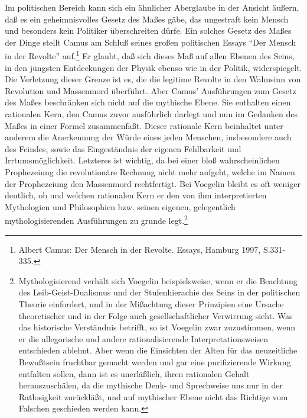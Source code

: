 Im politischen Bereich kann sich ein ähnlicher Aberglaube in der Ansicht
äußern, daß es ein geheimnisvolles Gesetz des Maßes gäbe, das ungestraft kein
Mensch und besonders kein Politiker überschreiten dürfe. Ein solches Gesetz
des Maßes der Dinge stellt Camus am Schluß seines großen politischen Essays
"`Der Mensch in der Revolte"' auf.\footnote{Albert Camus: Der Mensch in der
  Revolte. Essays, Hamburg 1997, S.331-335.} Er glaubt, daß sich dieses Maß
auf allen Ebenen des Seins, in den jüngsten Entdeckungen der Physik ebenso wie
in der Politik, widerspiegelt. Die Verletzung dieser Grenze ist es, die die
legitime Revolte in den Wahnsinn von Revolution und Massenmord überführt. Aber
Camus' Ausführungen zum Gesetz des Maßes beschränken sich nicht auf die
mythische Ebene. Sie enthalten einen rationalen Kern, den Camus zuvor
ausführlich darlegt und nun im Gedanken des Maßes in einer Formel
zusammenfaßt. Dieser rationale Kern beinhaltet unter anderem die Anerkennung
der Würde eines jeden Menschen, insbesondere auch des Feindes, sowie das
Eingeständnis der eigenen Fehlbarkeit und Irrtumsmöglichkeit. Letzteres ist
wichtig, da bei einer bloß wahrscheinlichen Prophezeiung die revolutionäre
Rechnung nicht mehr aufgeht, welche im Namen der Prophezeiung den Massenmord
rechtfertigt. Bei Voegelin bleibt es oft weniger deutlich, ob und welchen
rationalen Kern er den von ihm interpretierten Mythologien und Philosophien
bzw. seinen eigenen, gelegentlich mythologisierenden Ausführungen zu grunde
legt.\footnote{Mythologisierend verhält sich Voegelin beispielsweise, wenn er
  die Beachtung des Leib-Geist-Dualismus und der Stufenhierachie des Seins in
  der politischen Theorie einfordert, und in der Mißachtung dieser Prinzipien
  eine Ursache theoretischer und in der Folge auch gesellschaftlicher
  Verwirrung sieht. Was das historische Verständnis betrifft, so ist Voegelin
  zwar zuzustimmen, wenn er die allegorische und andere rationalisierende
  Interpretationsweisen entschieden ablehnt. Aber wenn die Einsichten der
  Alten für das neuzeitliche Bewußtsein fruchtbar gemacht werden und gar eine
  purifizierende Wirkung entfalten sollen, dann ist es unerläßlich, ihren
  rationalen Gehalt herauszuschälen, da die mythische Denk- und Sprechweise
  uns nur in der Ratlosigkeit zurückläßt, und auf mythischer Ebene nicht das
  Richtige vom Falschen geschieden werden kann.}

